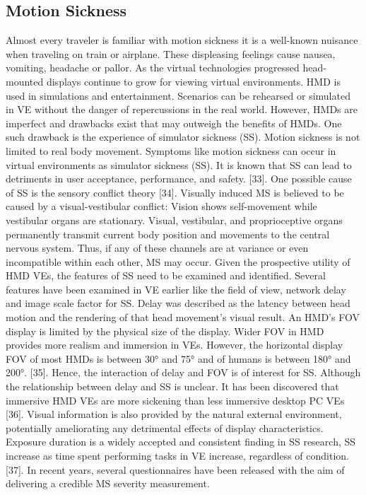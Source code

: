 \subsection{Motion Sickness}
Almost every traveler is familiar with motion sickness it is a well-known nuisance when traveling on train or airplane. These displeasing feelings cause nausea, vomiting, headache or pallor. As the virtual technologies progressed head-mounted displays continue to grow for viewing virtual environments. HMD is used in simulations and entertainment. Scenarios can be rehearsed or simulated in VE without the danger of repercussions in the real world. However, HMDs are imperfect and drawbacks exist that may outweigh the benefits of HMDs. One such drawback is the experience of simulator sickness (SS). Motion sickness is not limited to real body movement. Symptoms like motion sickness can occur in virtual environments as simulator sickness (SS). It is known that SS can lead to detriments in user acceptance, performance, and safety. [33]. One possible cause of SS is the sensory conflict theory [34]. Visually induced MS is believed to be caused by a visual-vestibular conflict: Vision shows self-movement while vestibular organs are stationary. Visual, vestibular, and proprioceptive organs permanently transmit current body position and movements to the central nervous system. Thus, if any of these channels are at variance or even incompatible within each other, MS may occur. Given the prospective utility of HMD VEs, the features of SS need to be examined and identified. Several features have been examined in VE earlier like the field of view, network delay and image scale factor for SS. Delay was described as the latency between head motion and the rendering of that head movement's visual result. 
An HMD's FOV display is limited by the physical size of the display. Wider FOV in HMD provides more realism and immersion in VEs. However, the horizontal display FOV of most HMDs is between 30° and 75° and of humans is between 180° and 200°. [35]. Hence, the interaction of delay and FOV is of interest for SS. Although the relationship between delay and SS is unclear. It has been discovered that immersive HMD VEs are more sickening than less immersive desktop PC VEs [36]. Visual information is also provided by the natural external environment, potentially ameliorating any detrimental effects of display characteristics. Exposure duration is a widely accepted and consistent finding in SS research, SS increase as time spent performing tasks in VE increase, regardless of condition. [37]. In recent years, several questionnaires have been released with the aim of delivering a credible MS severity measurement.
